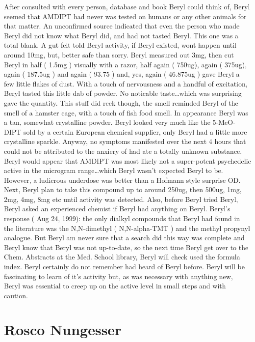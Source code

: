 \documentclass[12pt]{book}
\begin{document}
After consulted with every person, database and book Beryl could think of, Beryl seemed that AMDIPT had never was tested on humans or any other animals for that matter. An unconfirmed source indicated that even the person who made Beryl did not know what Beryl did, and had not tasted Beryl. This one was a total blank. A gut felt told Beryl activity, if Beryl existed, wont happen until around 10mg, but, better safe than sorry. Beryl measured out 3mg, then cut Beryl in half ( 1.5mg ) visually with a razor, half again ( 750ug), again ( 375ug), again ( 187.5ug ) and again ( 93.75 ) and, yes, again ( 46.875ug ) gave Beryl a few little flakes of dust. With a touch of nervousness and a handful of excitation, Beryl tasted this little dab of powder. No noticable taste\ldots which was surprising gave the quantity. This stuff did reek though, the smell reminded Beryl of the smell of a hamster cage, with a touch of fish food smell. In appearance Beryl was a tan, somewhat crystalline powder. Beryl looked very much like the 5-MeO-DIPT sold by a certain European chemical supplier, only Beryl had a little more crystalline sparkle. Anyway, no symptoms manifested over the next 4 hours that could not be attributed to the anxiery of had ate a totally unknown substance. Beryl would appear that AMDIPT was most likely not a super-potent psychedelic active in the microgram range\ldots which Beryl wasn't expected Beryl to be. However, a ludicrous underdose was better than a Hofmann style surprise OD. Next, Beryl plan to take this compound up to around 250ug, then 500ug, 1mg, 2mg, 4mg, 8mg etc until activity was detected. Also, before Beryl tried Beryl, Beryl asked an experienced chemist if Beryl had anything on Beryl. Beryl's response ( Aug 24, 1999): the only dialkyl compounds that Beryl had found in the literature was the N,N-dimethyl ( N,N-alpha-TMT ) and the methyl propynyl analogue. But Beryl am never sure that a search did this way was complete and Beryl know that Beryl was not up-to-date, so the next time Beryl get over to the Chem. Abstracts at the Med. School library, Beryl will check used the formula index. Beryl certainly do not remember had heard of Beryl before. Beryl will be fascinating to learn of it's activity but, as was necessary with anything new, Beryl was essential to creep up on the active level in small steps and with caution.



\chapter{Rosco Nungesser}
\end{document}
